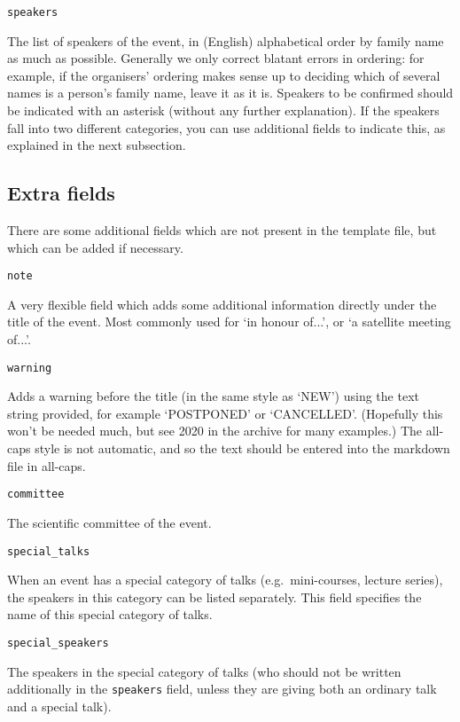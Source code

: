 \documentclass[12pt]{scrartcl}
\theoremstyle{definition}
\begin{document}
\noindent\verb|speakers|\nopagebreak

The list of speakers of the event, in (English) alphabetical order by family name as much as possible. Generally we only correct blatant errors in ordering: for example, if the organisers' ordering makes sense up to deciding which of several names is a person's family name, leave it as it is.
Speakers to be confirmed should be indicated with an asterisk (without any further explanation). If the speakers fall into two different categories, you can use additional fields to indicate this, as explained in the next subsection.

\subsection{Extra fields}

There are some additional fields which are not present in the template file, but which can be added if necessary.
\medskip

\noindent\verb|note|\nopagebreak

A very flexible field which adds some additional information directly under the title of the event.
Most commonly used for `in honour of...', or `a satellite meeting of...'.
\medskip

\noindent\verb|warning|\nopagebreak

Adds a warning before the title (in the same style as `NEW') using the text string provided, for example `POSTPONED' or `CANCELLED'.
(Hopefully this won't be needed much, but see 2020 in the archive for many examples.)
The all-caps style is not automatic, and so the text should be entered into the markdown file in all-caps.
\medskip

\noindent\verb|committee|\nopagebreak

The scientific committee of the event.
\medskip

\noindent\verb|special_talks|\nopagebreak

When an event has a special category of talks (e.g.\ mini-courses, lecture series), the speakers in this category can be listed separately.
This field specifies the name of this special category of talks.
\medskip

\noindent\verb|special_speakers|\nopagebreak

The speakers in the special category of talks (who should not be written additionally in the \verb|speakers| field, unless they are giving both an ordinary talk and a special talk).
\end{document}
